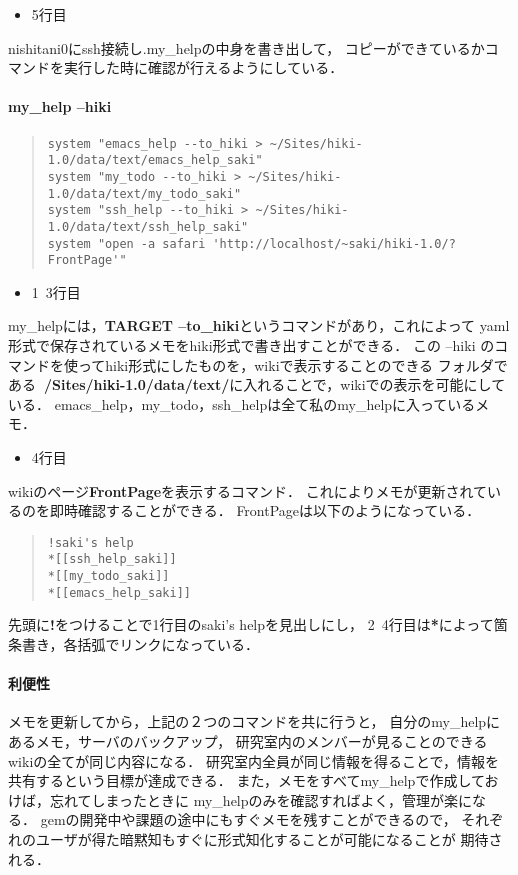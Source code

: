 \begin{itemize}
\item 5行目
\end{itemize}
nishitani0にssh接続し.my\_helpの中身を書き出して，
コピーができているかコマンドを実行した時に確認が行えるようにしている．

\paragraph{my\_help --hiki}\begin{quote}\begin{verbatim}
system "emacs_help --to_hiki > ~/Sites/hiki-1.0/data/text/emacs_help_saki"
system "my_todo --to_hiki > ~/Sites/hiki-1.0/data/text/my_todo_saki"
system "ssh_help --to_hiki > ~/Sites/hiki-1.0/data/text/ssh_help_saki"
system "open -a safari 'http://localhost/~saki/hiki-1.0/?FrontPage'"
\end{verbatim}\end{quote}
\begin{itemize}
\item 1~3行目
\end{itemize}
my\_helpには，\textbf{TARGET --to\_hiki}というコマンドがあり，これによって
yaml形式で保存されているメモをhiki形式で書き出すことができる．
この --hiki のコマンドを使ってhiki形式にしたものを，wikiで表示することのできる
フォルダである\textbf{~/Sites/hiki-1.0/data/text/}に入れることで，wikiでの表示を可能にしている．
emacs\_help，my\_todo，ssh\_helpは全て私のmy\_helpに入っているメモ．

\begin{itemize}
\item 4行目
\end{itemize}
wikiのページ\textbf{FrontPage}を表示するコマンド．
これによりメモが更新されているのを即時確認することができる．
FrontPageは以下のようになっている．
\begin{quote}\begin{verbatim}
!saki's help
*[[ssh_help_saki]]
*[[my_todo_saki]]
*[[emacs_help_saki]]
\end{verbatim}\end{quote}
先頭に\textbf{!}をつけることで1行目のsaki's helpを見出しにし，
2~4行目は\textbf{*}によって箇条書き，各括弧でリンクになっている．

\paragraph{利便性}
メモを更新してから，上記の２つのコマンドを共に行うと，
自分のmy\_helpにあるメモ，サーバのバックアップ，
研究室内のメンバーが見ることのできるwikiの全てが同じ内容になる．
研究室内全員が同じ情報を得ることで，情報を共有するという目標が達成できる．
また，メモをすべてmy\_helpで作成しておけば，忘れてしまったときに
my\_helpのみを確認すればよく，管理が楽になる．
gemの開発中や課題の途中にもすぐメモを残すことができるので，
それぞれのユーザが得た暗黙知もすぐに形式知化することが可能になることが
期待される．


